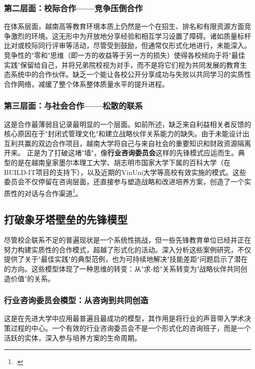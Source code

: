 \subsubsection{第二层面：校际合作——竞争压倒合作}
在体系层面，越南高等教育环境本质上仍然是一个在招生、排名和有限资源方面竞争激烈的环境。这无形中为开放地分享经验和相互学习设置了障碍。诸如质量标杆比对或校际同行评审等活动，尽管受到鼓励，但通常仅形式化地进行，未能深入。
竞争性的"零和"思维（即一方的收益等于另一方的损失）使得各校倾向于将"最佳实践"保留给自己，并将兄弟院校视为对手，而不是将它们视为共同发展的教育生态系统中的合作伙伴。缺乏一个能让各校公开分享成功与失败以共同学习的实质性合作网络，减缓了整个体系整体质量水平的提升进程。

\subsubsection{第三层面：与社会合作——松散的联系}
这是合作最薄弱且记录最明显的一个层面。如前所述，缺乏来自利益相关者反馈的核心原因在于"封闭式管理文化"和建立战略伙伴关系能力的缺失。由于未能设计出互利共赢的双边合作项目，越南大学将自己与来自社会的重要知识和财政资源隔离开来。
正是为了打破这堵"墙"，像\textbf{行业咨询委员会}这样的先锋模式应运而生。典型的是在越南皇家墨尔本理工大学、胡志明市国家大学下属的百科大学（在BUILD-IT项目的支持下），以及近期的VinUni大学等高校有效实施的模式。这些委员会不仅停留在咨询层面，还直接参与塑造战略和改进培养方案，创造了一个实质性的对话与合作渠道\footcite{rmit_iab_2023}。



\subsection{打破象牙塔壁垒的先锋模型}
\label{subsec:mo_hinh_tien_phong}

尽管校企联系不足的普遍现状是一个系统性挑战，但一些先锋教育单位已经并正在努力构建实质性的合作模式，超越了形式化的活动。深入分析这些案例研究，不仅提供了关于"最佳实践"的典型范例，也为可持续地解决"技能差距"问题启示了潜在的方向。这些模型体现了一种思维的转变：从"求-给"关系转变为"战略伙伴共同创造价值"的关系。

\subsubsection{行业咨询委员会模型：从咨询到共同创造}
这是在先进大学中应用最普遍且最成功的模型，其作用是将行业的声音带入学术决策过程的中心。一个有效的行业咨询委员会不是一个形式化的咨询班子，而是一个活跃的实体，深入参与培养方案的生命周期。

